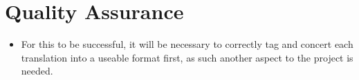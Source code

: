 \documentclass{article}
\begin{document}
\section{Quality Assurance}

\begin{itemize}
    \item{For this to be successful, it will be necessary to correctly tag and concert each translation into a useable format first, as such another aspect to the project is needed.}
\end{itemize}
\end{document}
